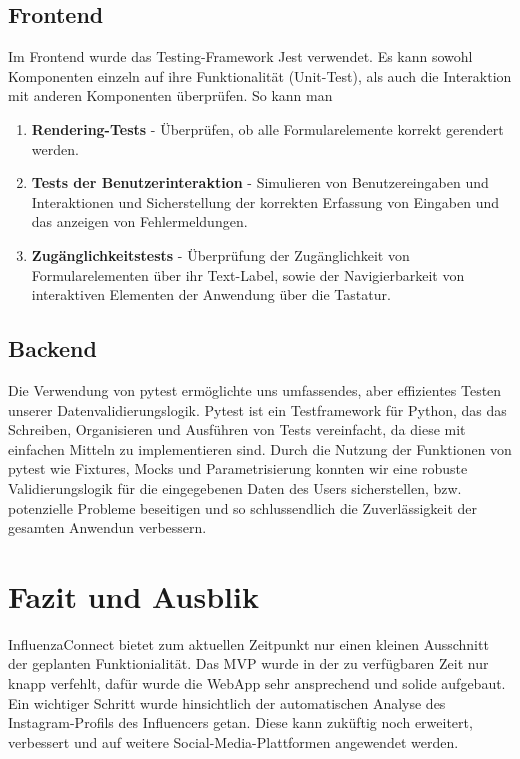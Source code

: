 \documentclass[conference,a4paper,flushend]{cs-techrep}
\begin{document}
\subsection{Frontend}
Im Frontend wurde das Testing-Framework Jest verwendet. Es kann sowohl Komponenten einzeln auf ihre Funktionalität (Unit-Test), als auch die Interaktion mit anderen Komponenten überprüfen. So kann man 

\begin{enumerate}
	\item{\textbf{Rendering-Tests} - Überprüfen, ob alle Formularelemente korrekt gerendert werden.}
	\item{\textbf{Tests der Benutzerinteraktion} - Simulieren von Benutzereingaben und Interaktionen und Sicherstellung der korrekten Erfassung von Eingaben und das anzeigen von Fehlermeldungen.}
	\item{\textbf{Zugänglichkeitstests} - Überprüfung der Zugänglichkeit von Formularelementen über ihr Text-Label, sowie der Navigierbarkeit von interaktiven Elementen der Anwendung über die Tastatur.}
\end{enumerate}


\subsection{Backend}
Die Verwendung von pytest ermöglichte uns umfassendes, aber effizientes Testen unserer Datenvalidierungslogik. Pytest ist ein Testframework für Python, das das Schreiben, Organisieren und Ausführen von Tests vereinfacht, da diese mit einfachen Mitteln zu implementieren sind. Durch die Nutzung der Funktionen von pytest wie Fixtures, Mocks und Parametrisierung konnten wir eine robuste Validierungslogik für die eingegebenen Daten des Users sicherstellen, bzw. potenzielle Probleme beseitigen und so schlussendlich die Zuverlässigkeit der gesamten Anwendun verbessern. 



\section{Fazit und Ausblik}
InfluenzaConnect bietet zum aktuellen Zeitpunkt nur einen kleinen Ausschnitt der geplanten Funktionialität. Das MVP wurde in der zu verfügbaren Zeit nur knapp verfehlt, dafür wurde die WebApp sehr ansprechend und solide aufgebaut. Ein wichtiger Schritt wurde hinsichtlich der automatischen Analyse des Instagram-Profils des Influencers getan. Diese kann zuküftig noch erweitert, verbessert und auf weitere Social-Media-Plattformen angewendet werden. 
\end{document}
